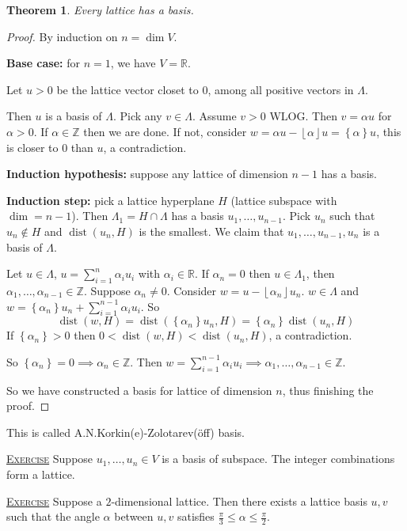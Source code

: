 \documentclass{report}
\newcommand{\R}{\mathbb{R}}
\newcommand{\Z}{\mathbb{Z}}
\def \dist {\operatorname{dist}}
\def \dist {\operatorname{dist}}
\newcommand{\floor}[1]{\left\lfloor #1 \right\rfloor}
\newcommand{\set}[1]{\left\{ #1 \right\}}
\newcommand{\fancyem}[1]{\underline{\textsc{#1}}}
\newtheorem{theorem}{Theorem}[section]
\theoremstyle{definition}
\theoremstyle{remark}
\numberwithin{equation}{section}
\begin{document}
\begin{theorem}
    Every lattice has a basis.
\end{theorem}
\begin{proof}
    By induction on $n = \dim V$.
    
    \textbf{Base case:} for $n = 1$, we have $V = \R$.

    Let $u > 0$ be the lattice vector closet to $0$, among all positive vectors in $\Lambda$.

    Then $u$ is a basis of $\Lambda$. Pick any $v \in \Lambda$. Assume $v > 0$ WLOG. Then $v = \alpha u$ for $\alpha > 0$. If $\alpha \in \Z$ then we are done. If not, consider $w = \alpha u - \floor{\alpha} u = \set{\alpha} u$, this is closer to $0$ than $u$, a contradiction.

    \textbf{Induction hypothesis:} suppose any lattice of dimension $n - 1$ has a basis.

    \textbf{Induction step:} pick a lattice hyperplane $H$ (lattice subspace with $\dim = n - 1$). Then $\Lambda_1 = H \cap \Lambda$ has a basis $u_1, \ldots, u_{n-1}$. Pick $u_n$ such that $u_n \notin H$ and $\dist(u_n, H)$ is the smallest. We claim that $u_1, \ldots, u_{n-1}, u_n$ is a basis of $\Lambda$.

    Let $u \in \Lambda$, $u = \sum_{i=1}^n \alpha_i u_i$ with $\alpha_i \in \R$. If $\alpha_n = 0$ then $u \in \Lambda_1$, then $\alpha_1, \ldots, \alpha_{n-1} \in \Z$. Suppose $\alpha_n \neq 0$. Consider $w = u - \floor{\alpha_n}u_n$. $w \in \Lambda$ and $w = \set{\alpha_n}u_n + \sum_{i=1}^{n-1} \alpha_i u_i$. So \[\dist(w, H) = \dist(\set{\alpha_n}u_n, H) = \set{\alpha_n}\dist(u_n, H)\] If $\set{\alpha_n} > 0$ then $0 < \dist(w, H) < \dist(u_n, H)$, a contradiction.

    So $\set{\alpha_n} = 0 \implies \alpha_n \in \Z$. Then $w = \sum_{i=1}^{n-1} \alpha_i u_i \implies \alpha_1, \ldots, \alpha_{n-1} \in \Z$.

    So we have constructed a basis for lattice of dimension $n$, thus finishing the proof.
\end{proof}


This is called A.N.Korkin(e)-Zolotarev(öff) basis.

\fancyem{Exercise} Suppose $u_1, \ldots, u_n \in V$ is a basis of subspace. The integer combinations form a lattice.

\fancyem{Exercise} Suppose a $2$-dimensional lattice. Then there exists a lattice basis $u, v$ such that the angle $\alpha$ between $u, v$ satisfies $\frac{\pi}{3} \leq \alpha \leq \frac{\pi}{2}$.
\end{document}
